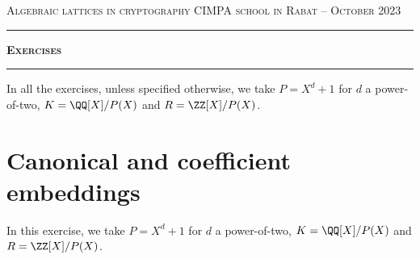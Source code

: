 \documentclass[11pt]{exam}
\theoremstyle{definition}
\begin{document}
{\noindent
   \textsc{Algebraic lattices in cryptography}
   \hfill {\textsc{CIMPA school in Rabat -- October 2023}}\\
  }
  \hrule
  \begin{center}
    {\Large\textbf{
   \textsc{Exercises}
    } } 
  \end{center}
  \hrule \vspace{5mm}

\thispagestyle{empty}

\vspace{0.2cm}


In all the exercises, unless specified otherwise, we take $P = X^d+1$ for $d$ a power-of-two, $K = \QQ[X]/P(X)$ and $R = \ZZ[X]/P(X)$.

\section{Canonical and coefficient embeddings}
In this exercise, we take $P = X^d+1$ for $d$ a power-of-two, $K = \QQ[X]/P(X)$ and $R = \ZZ[X]/P(X)$.
\end{document}

